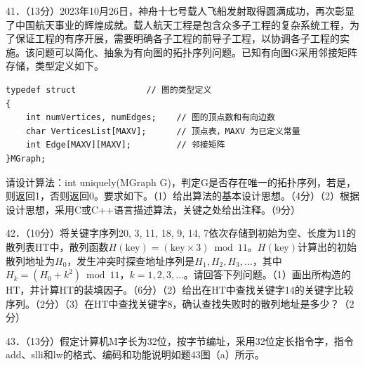 \documentclass[UTF8,11pt]{ctexart}
\begin{document}
41．（13分）2023年10月26日，神舟十七号载人飞船发射取得圆满成功，再次彰显了中国航天事业的辉煌成就。载人航天工程是包含众多子工程的复杂系统工程，为了保证工程的有序开展，需要明确各子工程的前导子工程，以协调各子工程的实施。该问题可以简化、抽象为有向图的拓扑序列问题。已知有向图G采用邻接矩阵存储，类型定义如下。


\begin{Verbatim}[breaklines,breakanywhere,fontsize=\small]
typedef struct              // 图的类型定义
{
    int numVertices, numEdges;    // 图的顶点数和有向边数
    char VerticesList[MAXV];      // 顶点表，MAXV 为已定义常量
    int Edge[MAXV][MAXV];         // 邻接矩阵
}MGraph;
\end{Verbatim}

请设计算法：int uniquely(MGraph G)，判定G是否存在唯一的拓扑序列，若是，则返回1，否则返回0。要求如下。（1）给出算法的基本设计思想。（4分）（2）根据设计思想，采用C或C++语言描述算法，关键之处给出注释。（9分）


42．（10分）将关键字序列20, 3, 11, 18, 9, 14, 7依次存储到初始为空、长度为11的散列表HT中，散列函数\(\displaystyle H(\mathrm{key})=(\mathrm{key}\times3)\bmod11\)。\(\displaystyle H(\mathrm{key})\)计算出的初始散列地址为\(\displaystyle H_0\)，发生冲突时探查地址序列是\(\displaystyle H_1,\allowbreak H_2,\allowbreak H_3,\allowbreak \ldots\)，其中\(\displaystyle H_k=(H_0+k^2)\bmod11\)，\(\displaystyle k=1,\allowbreak 2,\allowbreak 3,\allowbreak \ldots\)。请回答下列问题。（1）画出所构造的HT，并计算HT的装填因子。（6分）（2）给出在HT中查找关键字14的关键字比较序列。（2分）（3）在HT中查找关键字8，确认查找失败时的散列地址是多少？（2分）


43．（13分）假定计算机M字长为32位，按字节编址，采用32位定长指令字，指令add、slli和lw的格式、编码和功能说明如题43图（a）所示。
\end{document}
